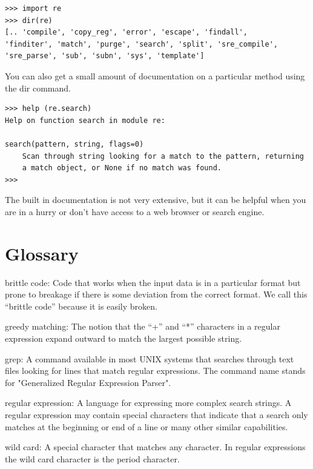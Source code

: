 \documentclass[10pt]{book}
\begin{document}
\beforeverb
\begin{verbatim}
>>> import re
>>> dir(re)
[.. 'compile', 'copy_reg', 'error', 'escape', 'findall', 
'finditer', 'match', 'purge', 'search', 'split', 'sre_compile', 
'sre_parse', 'sub', 'subn', 'sys', 'template']
\end{verbatim}
\afterverb
%
You can also get a small amount of documentation on a particular method using the dir command.

\beforeverb
\begin{verbatim}
>>> help (re.search)
Help on function search in module re:

search(pattern, string, flags=0)
    Scan through string looking for a match to the pattern, returning
    a match object, or None if no match was found.
>>> 
\end{verbatim}
\afterverb
%
The built in documentation is not very extensive, but it can be helpful when you are in a hurry
or don't have access to a web browser or search engine.

\section{Glossary}

\begin{description}

\item{brittle code:}
Code that works when the input data is in a particular format but prone to breakage
if there is some deviation from the correct format.  We call this ``brittle code'' 
because it is easily broken.

\item{greedy matching:}
The notion that the ``+'' and ``*'' characters in a regular expression expand outward to match the largest possible string.

\item{grep:}
A command available in most UNIX systems that searches through text files looking for lines that match regular expressions.  The command name stands for "Generalized Regular Expression Parser".

\item{regular expression:}
A language for expressing more complex search strings.  A regular expression may contain special characters that indicate that a search only matches at the beginning or end of a line or many other similar capabilities.

\item{wild card:}
A special character that matches any character.   In regular expressions the wild card character is the period character.

\end{description}
\end{document}
